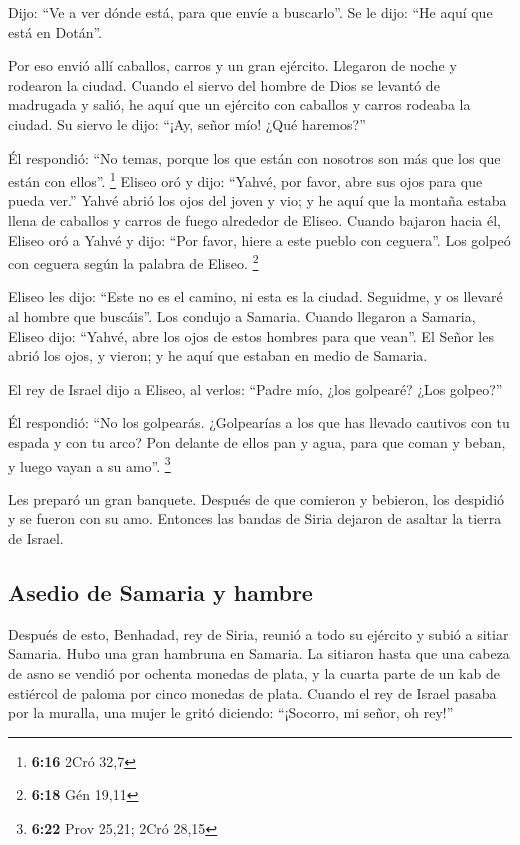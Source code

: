 \begin{paracol}{2}
 Dijo: ``Ve a ver dónde está, para que envíe a
buscarlo''. Se le dijo: ``He aquí que está en Dotán''.

 Por eso envió allí caballos, carros y un gran ejército.
Llegaron de noche y rodearon la ciudad.  Cuando el siervo
del hombre de Dios se levantó de madrugada y salió, he aquí que un
ejército con caballos y carros rodeaba la ciudad. Su siervo le dijo:
``¡Ay, señor mío! ¿Qué haremos?''

 Él respondió: ``No temas, porque los que están con
nosotros son más que los que están con ellos''. \footnote{\textbf{6:16}
  2Cró 32,7}  Eliseo oró y dijo: ``Yahvé, por favor, abre
sus ojos para que pueda ver.'' Yahvé abrió los ojos del joven y vio; y
he aquí que la montaña estaba llena de caballos y carros de fuego
alrededor de Eliseo.  Cuando bajaron hacia él, Eliseo oró
a Yahvé y dijo: ``Por favor, hiere a este pueblo con ceguera''. Los
golpeó con ceguera según la palabra de Eliseo. \footnote{\textbf{6:18}
  Gén 19,11}

 Eliseo les dijo: ``Este no es el camino, ni esta es la
ciudad. Seguidme, y os llevaré al hombre que buscáis''. Los condujo a
Samaria.  Cuando llegaron a Samaria, Eliseo dijo:
``Yahvé, abre los ojos de estos hombres para que vean''. El Señor les
abrió los ojos, y vieron; y he aquí que estaban en medio de Samaria.

 El rey de Israel dijo a Eliseo, al verlos: ``Padre mío,
¿los golpearé? ¿Los golpeo?''

 Él respondió: ``No los golpearás. ¿Golpearías a los que
has llevado cautivos con tu espada y con tu arco? Pon delante de ellos
pan y agua, para que coman y beban, y luego vayan a su amo''.
\footnote{\textbf{6:22} Prov 25,21; 2Cró 28,15}

 Les preparó un gran banquete. Después de que comieron y
bebieron, los despidió y se fueron con su amo. Entonces las bandas de
Siria dejaron de asaltar la tierra de Israel.

\hypertarget{asedio-de-samaria-y-hambre}{%
\subsection{Asedio de Samaria y
hambre}\label{asedio-de-samaria-y-hambre}}

 Después de esto, Benhadad, rey de Siria, reunió a todo
su ejército y subió a sitiar Samaria.  Hubo una gran
hambruna en Samaria. La sitiaron hasta que una cabeza de asno se vendió
por ochenta monedas de plata, y la cuarta parte de un kab de estiércol
de paloma por cinco monedas de plata.  Cuando el rey de
Israel pasaba por la muralla, una mujer le gritó diciendo: ``¡Socorro,
mi señor, oh rey!''


\end{paracol}
